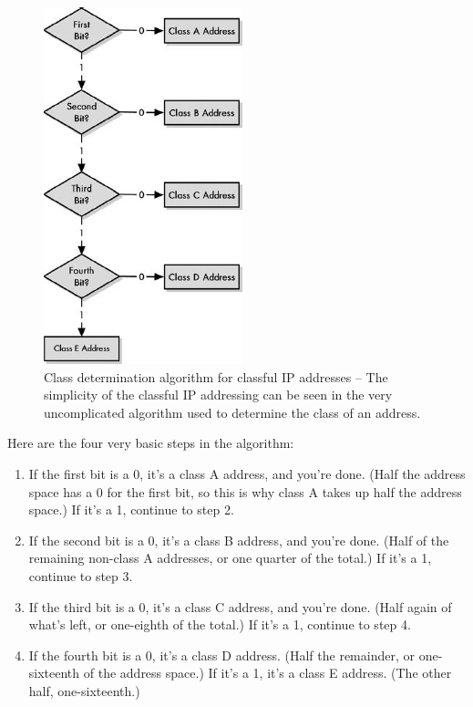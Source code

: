 \documentclass[b5paper,11pt]{memoir}
\begin{document}
\begin{figure}
   \centering
   \includegraphics[width=.5\textwidth]{images/class-determination.jpg}
   \caption[Class determination algorithm for classful IP addresses]{Class determination algorithm for classful IP addresses -- The simplicity of the classful IP addressing can be seen in the very uncomplicated algorithm used to determine the class of an address.}
   \label{fig:class-determination}
\end{figure}


Here are the four very basic steps in the algorithm:

\begin{enumerate}
   \item
      If the first bit is a 0, it's a class A address, and you're done.
      (Half the address space has a 0 for the first bit, so this is why class A takes up half the address space.)
      If it's a 1, continue to step 2.
   \item
      If the second bit is a 0, it's a class B address, and you're done.
      (Half of the remaining non-class A addresses, or one quarter of the total.)
      If it's a 1, continue to step 3.
   \item
      If the third bit is a 0, it's a class C address, and you're done.
      (Half again of what's left, or one-eighth of the total.) 
      If it's a 1, continue to step 4.
   \item
      If the fourth bit is a 0, it's a class D address.
      (Half the remainder, or one-sixteenth of the address space.) 
      If it's a 1, it's a class E address.
      (The other half, one-sixteenth.)
\end{enumerate}
\end{document}
